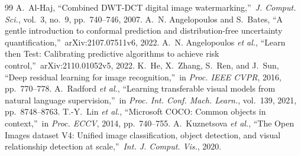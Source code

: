 \documentclass[conference]{IEEEtran}
\begin{document}
\begin{thebibliography}{99}
A.~Al-Haj, \textquotedblleft Combined DWT-DCT digital image watermarking,\textquotedblright\ \emph{J. Comput. Sci.}, vol.~3, no.~9, pp.~740--746, 2007.
A.~N. Angelopoulos and S.~Bates, \textquotedblleft A gentle introduction to conformal prediction and distribution-free uncertainty quantification,\textquotedblright\ arXiv:2107.07511v6, 2022.
A.~N. Angelopoulos \emph{et al.}, \textquotedblleft Learn then Test: Calibrating predictive algorithms to achieve risk control,\textquotedblright\ arXiv:2110.01052v5, 2022.
K.~He, X.~Zhang, S.~Ren, and J.~Sun, \textquotedblleft Deep residual learning for image recognition,\textquotedblright\ in \emph{Proc. IEEE CVPR}, 2016, pp.~770--778.
A.~Radford \emph{et al.}, \textquotedblleft Learning transferable visual models from natural language supervision,\textquotedblright\ in \emph{Proc. Int. Conf. Mach. Learn.}, vol.~139, 2021, pp.~8748--8763.
T.-Y.~Lin \emph{et al.}, \textquotedblleft Microsoft COCO: Common objects in context,\textquotedblright\ in \emph{Proc. ECCV}, 2014, pp.~740--755.
A.~Kuznetsova \emph{et al.}, \textquotedblleft The Open Images dataset V4: Unified image classification, object detection, and visual relationship detection at scale,\textquotedblright\ \emph{Int. J. Comput. Vis.}, 2020.
\end{thebibliography}
\end{document}
